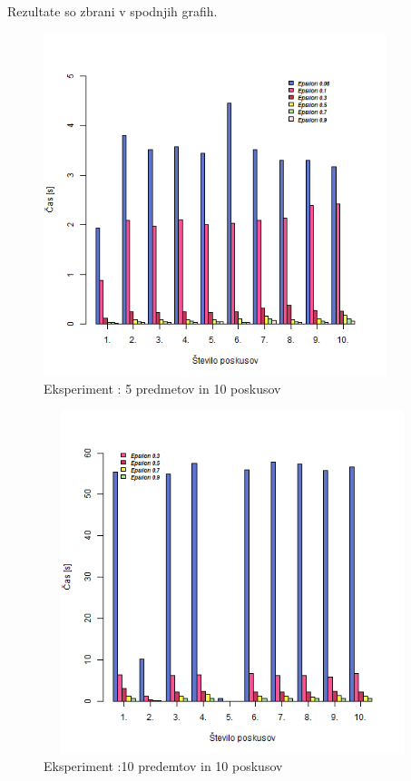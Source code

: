 \documentclass[a4paper,12pt]{article}
\begin{document}
\noindent Rezultate so zbrani  v spodnjih grafih.

\newpage


\begin{figure}[H]
\centering
\caption{Eksperiment : 5 predmetov in 10 poskusov}
\includegraphics[width=10cm, height = 10cm]{5predmetov}
\end{figure}


\begin{figure}[H]
\centering
\caption{Eksperiment :10 predemtov in 10 poskusov}
\includegraphics[width=11cm, height = 10cm]{10predmetov}
\end{figure}
\end{document}
